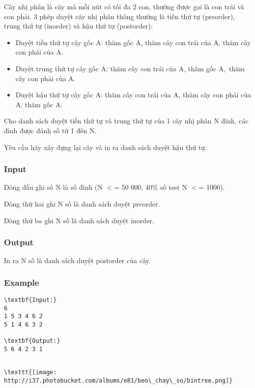 

Cây nhị phân là cây mà mỗi nút có tối đa 2 con, thường được gọi là con trái và con phải. 3 phép duyệt cây nhị phân thông thường là tiền thứ tự (preorder), trung thứ tự (inorder) và hậu thứ tự (postorder):
\begin{itemize}
	\item Duyệt tiền thứ tự cây gốc A: thăm gốc A, thăm cây con trái của A, thăm cây con phải của A.
	\item Duyệt trung thứ tự cây gốc A: thăm cây con trái của A, thăm gốc A, thăm cây con phải của A.
	\item Duyệt hậu thứ tự cây gốc A: thăm cây con trái của A, thăm cây con phải của A, thăm gốc A.
\end{itemize}

Cho danh sách duyệt tiền thứ tự và trung thứ tự của 1 cây nhị phân N đỉnh, các đỉnh được đánh số từ 1 đến N.

Yêu cầu hãy xây dựng lại cây và in ra danh sách duyệt hậu thứ tự.

\subsubsection{Input \href{http://vi.wikipedia.org/wiki/Duy%E1%BB%87t_c%C3%A2y}{}}

Dòng đầu ghi số N là số đỉnh (N $<$= 50 000, 40\% số test N $<$= 1000).

Dòng thứ hai ghi N số là danh sách duyệt preorder.

Dòng thứ ba ghi N số là danh sách duyệt inorder.

\subsubsection{Output}

In ra N số là danh sách duyệt postorder của cây.

\subsubsection{Example}
\begin{verbatim}
\textbf{Input:}
6
1 5 3 4 6 2
5 1 4 6 3 2

\textbf{Output:}
5 6 4 2 3 1\end{verbatim}
\begin{verbatim}

\texttt{[image: http://i37.photobucket.com/albums/e81/beo\_chay\_so/bintree.png]}\end{verbatim}